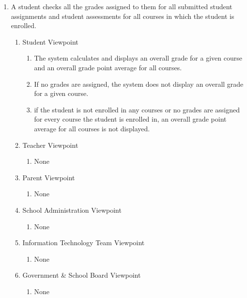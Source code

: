 \documentclass[]{article}
\begin{document}
\begin{enumerate}[{BE}1.]
	\item A student checks all the grades assigned to them for all submitted
student assignments and student assessments for all courses in which the student
is enrolled.
	\begin{enumerate}[{VP2}.1]
		\item Student Viewpoint
			\begin{enumerate}
				\item The system calculates and displays an overall grade for a given course
and an overall grade point average for all courses.
				\item If no grades are assigned, the system does not display an overall
grade for a given course.
				\item if the student is not enrolled in any courses or no grades are
assigned for every course the student is enrolled in, an overall grade point
average for all courses is not displayed.
			\end{enumerate}
		\item Teacher Viewpoint
			\begin{enumerate}
				\item None
			\end{enumerate}
		\item Parent Viewpoint
			\begin{enumerate}
				\item None
			\end{enumerate}
		\item School Administration Viewpoint
			\begin{enumerate}
				\item None
			\end{enumerate}
		\item Information Technology Team Viewpoint
			\begin{enumerate}
				\item None
			\end{enumerate}
		\item Government \& School Board Viewpoint
			\begin{enumerate}
				\item None
			\end{enumerate}
	\end{enumerate}


\end{enumerate}
\end{document}
